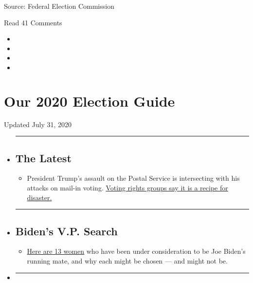 Source: Federal Election Commission

Read 41 Comments

\begin{itemize}
\item
\item
\item
\item
\end{itemize}

\hypertarget{our-2020-election-guide}{%
\section{Our 2020 Election Guide}\label{our-2020-election-guide}}

Updated July 31, 2020

\begin{itemize}
\item
  \begin{center}\rule{0.5\linewidth}{\linethickness}\end{center}

  \hypertarget{the-latest}{%
  \subsection{The Latest}\label{the-latest}}

  \begin{itemize}
  \tightlist
  \item
    President Trump's assault on the Postal Service is intersecting with
    his attacks on mail-in voting.
    \href{https://www.nytimes.com/2020/07/31/us/politics/trump-usps-mail-delays.html?action=click\&pgtype=Article\&state=default\&region=BELOW_MAIN_CONTENT\&context=storylines_guide}{Voting
    rights groups say it is a recipe for disaster.}
  \end{itemize}
\item
  \begin{center}\rule{0.5\linewidth}{\linethickness}\end{center}

  \hypertarget{bidens-vp-search}{%
  \subsection{Biden's V.P. Search}\label{bidens-vp-search}}

  \begin{itemize}
  \tightlist
  \item
    \href{https://www.nytimes.com/article/biden-vice-president-2020.html?action=click\&pgtype=Article\&state=default\&region=BELOW_MAIN_CONTENT\&context=storylines_guide}{Here
    are 13 women} who have been under consideration to be Joe Biden's
    running mate, and why each might be chosen --- and might not be.
  \end{itemize}
\item
  \begin{center}\rule{0.5\linewidth}{\linethickness}\end{center}


\end{itemize}
